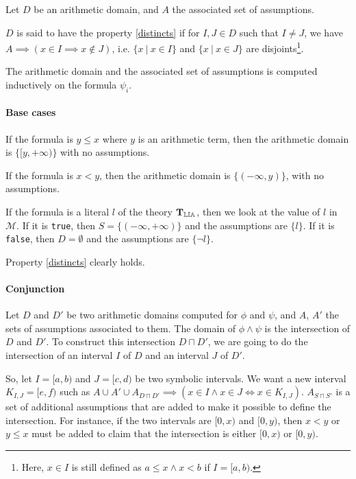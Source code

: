 \begin{property}[Distincts]

Let $D$ be an arithmetic domain, and $A$ the associated set of assumptions.

$D$ is said to have the property \ref{distincts} if for $I, J \in D$ such that
$I \neq J$, we have $A \implies (x \in I \implies x \not\in J)$, i.e.
$\{x\ |\ x \in I\}$ and $\{x\ |\ x \in J\}$ are
disjoints\footnote{Here, $x \in I$ is still defined as $a \le x \land x < b$ if $I = [a, b)$.}.

\label{distincts}

\end{property}


The arithmetic domain and the associated set of assumptions is computed inductively on the formula
$\psi_i$.

\paragraph{Base cases}

If the formula is $y \le x$ where $y$ is an arithmetic term, then the arithmetic domain is
$\{[y, +\infty)\}$ with no assumptions.

If the formula is $x < y$, then the arithmetic domain is $\{(-\infty, y)\}$, with no assumptions.

If the formula is a literal $l$ of the theory $\operatorname{\mathbf{T}_{\mathbb{LIA}}}$, then we look at the value of $l$ in
$\mathcal{M}$. If it is \texttt{true}, then $S = \{(-\infty, +\infty)\}$ and the assumptions are
$\{l\}$. If it is \texttt{false}, then $D = \emptyset$ and the assumptions are $\{\lnot l\}$.

Property \ref{distincts} clearly holds.

\paragraph{Conjunction}

Let $D$ and $D'$ be two arithmetic domains computed for $\phi$ and $\psi$, and $A$, $A'$ the sets of assumptions associated to
them. The domain of $\phi\land\psi$ is the intersection of $D$ and $D'$. To construct this intersection $D \sqcap D'$, we are going to
do the intersection of an interval $I$ of $D$ and an interval $J$
of $D'$.

So, let $I = [a, b)$ and $J = [c, d)$ be two symbolic intervals. We want a new
interval $K_{I, J} = [e, f)$ such as
$A \cup A' \cup A_{D \sqcap D'} \implies \left(x \in I \land x \in J \iff x \in K_{I, J}\right)$.
$A_{S \sqcap S'}$ is a set of additional assumptions that are added to make it possible to define
the
intersection. For instance, if the two intervals are $[0, x)$ and $[0, y)$, then $x < y$ or $y \le x$
must be added to claim that the intersection is either $[0, x)$ or $[0, y)$.

